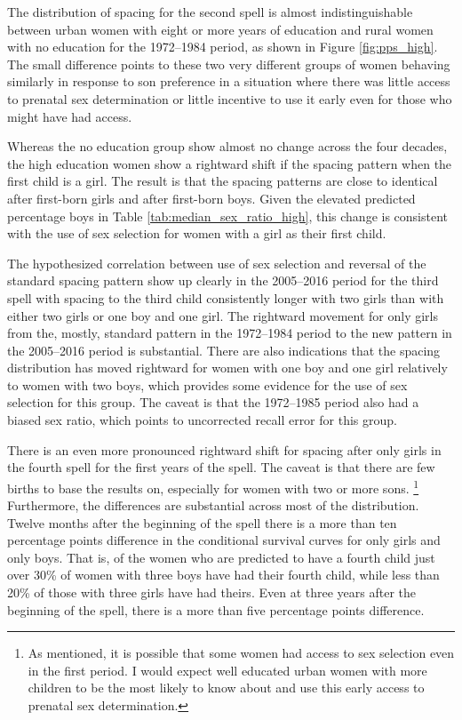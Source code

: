 \documentclass[12pt,letterpaper]{article}
\begin{document}
The distribution of spacing for the second spell is almost indistinguishable 
between urban women with eight or more years of education and rural women 
with no education for the 1972--1984 period, as shown in Figure \ref{fig:pps_high}.
The small difference points to these two very different groups of women behaving similarly
in response to son preference in a situation where there was little access to
prenatal sex determination or little incentive to use it early even for those 
who might have had access.

Whereas the no education group show almost no change across the four decades,
the high education women show a rightward shift if the spacing pattern when
the first child is a girl.
The result is that the spacing patterns are close to identical after first-born 
girls and after first-born boys.
Given the elevated predicted percentage boys in Table \ref{tab:median_sex_ratio_high},
this change is consistent with the use of sex selection for women with a girl 
as their first child.

The hypothesized correlation between use of sex selection and reversal of 
the standard spacing pattern show up clearly in the 2005--2016 period for the 
third spell with spacing to the third child consistently longer with two girls 
than with either two girls or one boy and one girl.
The rightward movement for only girls from the, mostly, standard pattern in 
the 1972--1984 period to the new pattern in the 2005--2016 period is substantial.
There are also indications that the spacing distribution has moved rightward
for women with one boy and one girl relatively to women with two boys, which
provides some evidence for the use of sex selection for this group.
The caveat is that the 1972--1985 period also had a biased sex ratio, which
points to uncorrected recall error for this group.

There is an even more pronounced rightward shift for spacing after only
girls in the fourth spell for the first years of the spell. 
The caveat is that there are few births to base the results on,
especially for women with two or more sons.%
\footnote{
As mentioned, it is possible that some women had access to sex selection even
in the first period.
I would expect well educated urban women with more children to be the
most likely to know about and use this early access to prenatal sex determination.
}
Furthermore, the differences are substantial across most of the distribution.
Twelve months after the beginning of the spell there is a more than ten 
percentage points difference in the conditional survival curves for only girls
and only boys.
That is, of the women who are predicted to have a fourth child just over 30\%
of women with three boys have had their fourth child, while less than 20\% of
those with three girls have had theirs.
Even at three years after the beginning of the spell, there is a more than 
five percentage points difference.
\end{document}
